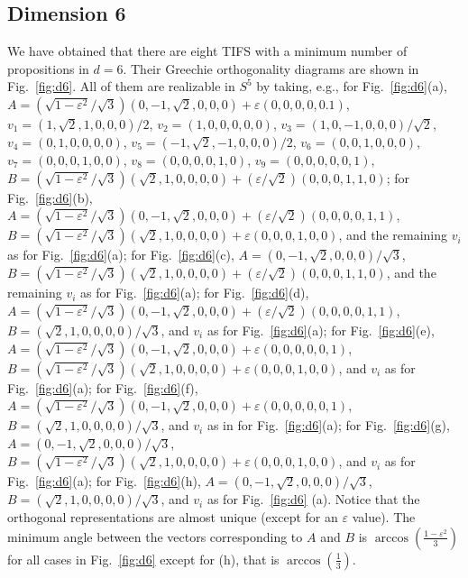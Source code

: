\documentclass[%
 twocolumn,
 groupedaddress,
 showpacs,
 showkeys,
 preprintnumbers,
 amsmath,amssymb,
 aps,
 pra,
 longbibliography,
 floatfix,
 ]{revtex4-1}
\begin{document}

\subsection{Dimension 6}


We have obtained that there are eight TIFS with a minimum number of propositions in $d=6$. Their Greechie orthogonality diagrams are shown in Fig.~\ref{fig:d6}. All of them are realizable in $S^5$ by taking,
e.g., for Fig.~\ref{fig:d6}(a),
$A = (\sqrt{1-\varepsilon^2} / \sqrt{3})({0,-1,\sqrt{2},0,0,0} )+\varepsilon({0,0,0,0,0.1})$,
$v_1 = ({1,\sqrt{2},1,0,0,0} )/ 2 $,
$v_2 = ({1,0,0,0,0,0} )$,
$v_3 = ({1,0,-1,0,0,0} )/\sqrt{2}$,
$v_4 = ({0,1,0,0,0,0} ) $,
$v_5 = ({-1,\sqrt{2},-1,0,0,0} )/ 2$,
$v_6 = ({0,0,1,0,0,0} ) $,
$v_7 = ({0,0,0,1,0,0} )$,
$v_{8} = ({0,0,0,0,1,0} )$,
$v_{9} = ({0,0,0,0,0,1} )$,
$B = (\sqrt{1-\varepsilon^2} / \sqrt{3}) ({\sqrt{2},1,0,0,0,0})+(\varepsilon/\sqrt{2})({0,0,0,1,1,0})$;
for Fig.~\ref{fig:d6}(b),
$A = (\sqrt{1-\varepsilon^2} / \sqrt{3}) ({0,-1,\sqrt{2},0,0,0})+(\varepsilon/\sqrt{2})({0,0,0,0,1,1})$,
$B = (\sqrt{1-\varepsilon^2} / \sqrt{3}) ({\sqrt{2},1,0,0,0,0})+\varepsilon({0,0,0,1,0,0})$, 
		and the remaining $v_i$ as for Fig.~\ref{fig:d6}(a); 
for Fig.~\ref{fig:d6}(c),
$A = ({0,-1,\sqrt{2},0,0,0})/ \sqrt{3}$,
$B = (\sqrt{1-\varepsilon^2} / \sqrt{3}) ({\sqrt{2},1,0,0,0,0})+(\varepsilon/\sqrt{2})({0,0,0,1,1,0})$,
		and the remaining $v_i$ as for Fig.~\ref{fig:d6}(a);
for Fig.~\ref{fig:d6}(d),
$A = (\sqrt{1-\varepsilon^2} / \sqrt{3}) ({0,-1,\sqrt{2},0,0,0})+(\varepsilon/\sqrt{2})({0,0,0,0,1,1})$,
$B = ({\sqrt{2},1,0,0,0,0})/ \sqrt{3}$,
		and $v_i$ as for Fig.~\ref{fig:d6}(a);
for Fig.~\ref{fig:d6}(e),
$A = (\sqrt{1-\varepsilon^2} / \sqrt{3}) ({0,-1,\sqrt{2},0,0,0})+\varepsilon({0,0,0,0,0,1})$,
$B = (\sqrt{1-\varepsilon^2} / \sqrt{3}) ({\sqrt{2},1,0,0,0,0})+\varepsilon({0,0,0,1,0,0})$,
		and $v_i$ as for Fig.~\ref{fig:d6}(a);
for Fig.~\ref{fig:d6}(f),
$A = (\sqrt{1-\varepsilon^2} / \sqrt{3}) ({0,-1,\sqrt{2},0,0,0})+\varepsilon({0,0,0,0,0,1})$,
$B = ({\sqrt{2},1,0,0,0,0})/ \sqrt{3}$,
		and $v_i$ as in for Fig.~\ref{fig:d6}(a);
for Fig.~\ref{fig:d6}(g),
$A = ({0,-1,\sqrt{2},0,0,0})/ \sqrt{3}$,
$B = (\sqrt{1-\varepsilon^2} / \sqrt{3}) ({\sqrt{2},1,0,0,0,0})+\varepsilon({0,0,0,1,0,0})$,
		and $v_i$ as for Fig.~\ref{fig:d6}(a);
for Fig.~\ref{fig:d6}(h),
$A = ({0,-1,\sqrt{2},0,0,0})/ \sqrt{3}$,
$B = ({\sqrt{2},1,0,0,0,0})/ \sqrt{3}$,
		and $v_i$ as for Fig.~\ref{fig:d6} (a).
		Notice that the orthogonal representations are almost unique (except for an $\varepsilon$ value).
The minimum angle between the vectors corresponding to $A$ and $B$ is $\arccos\left(\frac{1-\varepsilon^2}{3}\right)$ for all cases in Fig.~\ref{fig:d6} except for (h), that is $\arccos\left(\frac{1}{3}\right)$.
\end{document}
